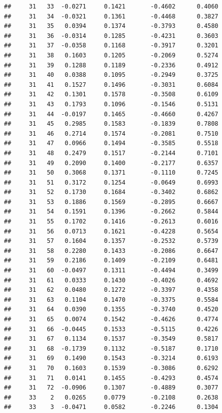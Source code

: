 \documentclass[
]{article}
\begin{document}
\begin{verbatim}
##     31   33  -0.0271     0.1421       -0.4602      0.4060  
##     31   34  -0.0321     0.1361       -0.4468      0.3827  
##     31   35   0.0394     0.1374       -0.3793      0.4580  
##     31   36  -0.0314     0.1285       -0.4231      0.3603  
##     31   37  -0.0358     0.1168       -0.3917      0.3201  
##     31   38   0.1603     0.1205       -0.2069      0.5274  
##     31   39   0.1288     0.1189       -0.2336      0.4912  
##     31   40   0.0388     0.1095       -0.2949      0.3725  
##     31   41   0.1527     0.1496       -0.3031      0.6084  
##     31   42   0.1301     0.1578       -0.3508      0.6109  
##     31   43   0.1793     0.1096       -0.1546      0.5131  
##     31   44  -0.0197     0.1465       -0.4660      0.4267  
##     31   45   0.2985     0.1583       -0.1839      0.7808  
##     31   46   0.2714     0.1574       -0.2081      0.7510  
##     31   47   0.0966     0.1494       -0.3585      0.5518  
##     31   48   0.2479     0.1517       -0.2144      0.7101  
##     31   49   0.2090     0.1400       -0.2177      0.6357  
##     31   50   0.3068     0.1371       -0.1110      0.7245  
##     31   51   0.3172     0.1254       -0.0649      0.6993  
##     31   52   0.1730     0.1684       -0.3402      0.6862  
##     31   53   0.1886     0.1569       -0.2895      0.6667  
##     31   54   0.1591     0.1396       -0.2662      0.5844  
##     31   55   0.1702     0.1416       -0.2613      0.6016  
##     31   56   0.0713     0.1621       -0.4228      0.5654  
##     31   57   0.1604     0.1357       -0.2532      0.5739  
##     31   58   0.2280     0.1433       -0.2086      0.6647  
##     31   59   0.2186     0.1409       -0.2109      0.6481  
##     31   60  -0.0497     0.1311       -0.4494      0.3499  
##     31   61   0.0333     0.1430       -0.4026      0.4692  
##     31   62   0.0480     0.1272       -0.3397      0.4358  
##     31   63   0.1104     0.1470       -0.3375      0.5584  
##     31   64   0.0390     0.1355       -0.3740      0.4520  
##     31   65   0.0074     0.1542       -0.4626      0.4774  
##     31   66  -0.0445     0.1533       -0.5115      0.4226  
##     31   67   0.1134     0.1537       -0.3549      0.5817  
##     31   68  -0.1739     0.1132       -0.5187      0.1710  
##     31   69   0.1490     0.1543       -0.3214      0.6193  
##     31   70   0.1603     0.1539       -0.3086      0.6292  
##     31   71   0.0141     0.1455       -0.4293      0.4574  
##     31   72  -0.0906     0.1307       -0.4889      0.3077  
##     33    2   0.0265     0.0779       -0.2108      0.2638  
##     33    3  -0.0471     0.0582       -0.2246      0.1304  

\end{verbatim}
\end{document}
